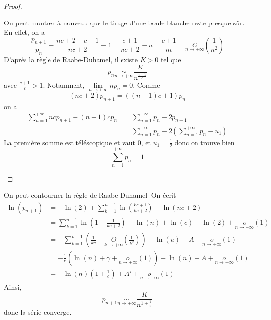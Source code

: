\documentclass[12pt]{article}
\begin{document}
\begin{proof}
\begin{enumerate}
        On peut montrer à nouveau que le tirage d'une boule blanche reste presque sûr. En effet, on a 
        \begin{equation}
            \frac{p_{n+1}}{p_{n}}=\frac{nc+2-c-1}{nc+2}=1-\frac{c+1}{nc+2}=a-\frac{c+1}{nc}+\underset{n\to+\infty}{O}\left(\frac{1}{n^{2}}\right)
        \end{equation}
        D'après la règle de Raabe-Duhamel, il existe $K>0$ tel que 
        \begin{equation}
            p_{n}\underset{n\to+\infty}{\sim}\frac{K}{n^{\frac{c+1}{c}}}
        \end{equation}
        avec $\frac{c+1}{c}>1$. Notamment, $\lim\limits_{n\to+\infty}np_{n}=0$. Comme 
        \begin{equation}
            \left(nc+2\right)p_{n+1}=\left(\left(n-1\right)c+1\right)p_{n}
        \end{equation}
        on a 
        \begin{align}
            \sum_{n=1}^{+\infty}ncp_{n+1}-\left(n-1\right)cp_{n}
            &=\sum_{n=1}^{+\infty}p_{n}-2p_{n+1}\\
            &=\sum_{n=1}^{+\infty}p_{n}-2\left(\sum_{n=1}^{+\infty}p_{n}-u_{1}\right)
        \end{align}
        La première somme est téléscopique et vaut 0, et $u_{1}=\frac{1}{2}$ donc on trouve bien 
        \begin{equation}
            \sum_{n=1}^{+\infty}p_{n}=1
        \end{equation}
    \end{enumerate}
\end{proof}

\begin{remark}
    On peut contourner la règle de Raabe-Duhamel. On écrit 
    \begin{align}
        \ln\left(p_{n+1}\right)
        &=-\ln\left(2\right)+\sum_{k=1}^{n-1}\ln\left(\frac{kc+1}{kc+2}\right)-\ln\left(nc+2\right)\\
        &=\sum_{k=1}^{n-1}\ln\left(1-\frac{1}{kc+2}\right)-\ln\left(n\right)+\ln\left(c\right)-\ln(2)+\underset{n\to+\infty}{o}\left(1\right)\\
        &=-\sum_{k=1}^{n-1}\left(\frac{1}{kc}+\underset{k\to+\infty}{O}\left(\frac{1}{k^{2}}\right)\right)-\ln\left(n\right)-A+\underset{n\to+\infty}{o}\left(1\right)\\
        &=-\frac{1}{c}\left(\ln\left(n\right)+\gamma+\underset{n\to+\infty}{o}\left(1\right)\right)-\ln\left(n\right)-A+\underset{n\to+\infty}{o}\left(1\right)\\
        &=-\ln\left(n\right)\left(1+\frac{1}{c}\right)+A'+\underset{n\to+\infty}{o}\left(1\right)
    \end{align}
    Ainsi, 
    \begin{equation}
        p_{n+1}\underset{n\to+\infty}{\sim}\frac{K}{n^{1+\frac{1}{c}}}
    \end{equation}
    donc la série converge.
\end{remark}
\end{document}
